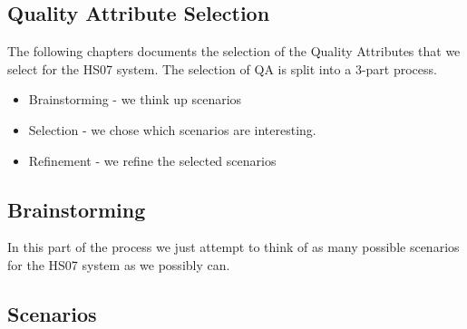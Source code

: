 \documentclass[a4paper,10pt]{article}
\begin{document}
\subsection{Quality Attribute Selection}
The following chapters documents the selection of the Quality Attributes that we 
select for the HS07 system. The selection of QA is split into a 3-part process.
\begin{itemize}
\item Brainstorming - we think up scenarios
\item Selection - we chose which scenarios are interesting.
\item Refinement - we refine the selected scenarios
\end{itemize}
\subsection{Brainstorming}
In this part of the process we just attempt to think of as many possible scenarios for the HS07 system as we possibly can. 

\subsection{Scenarios}
\end{document}
